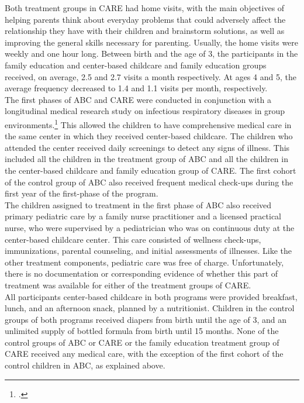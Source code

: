 \noindent Both treatment groups in CARE had home visits, with the main objectives of helping parents think about everyday problems that could adversely affect the relationship they have with their children and brainstorm solutions, as well as improving the general skills necessary for parenting. Usually, the home visits were weekly and one hour long. Between birth and the age of 3, the participants in the family education and center-based childcare and family education groups received, on average, 2.5 and 2.7  visits a month respectively. At ages 4 and 5, the average frequency decreased to 1.4 and 1.1 visits per month, respectively.\\ 

\noindent The first phases of ABC and CARE were conducted in conjunction with a longitudinal medical research study on infectious respiratory diseases in group environments.\footnote{\citet{Henderson-et-al_1982_NEJoM}.} This allowed the children to have comprehensive medical care in the same center in which they received center-based childcare. The children who attended the center received daily screenings to detect any signs of illness. This included all the children in the treatment group of ABC and all the children in the center-based childcare and family education group of CARE. The first cohort of the control group of ABC also received frequent medical check-ups during the first year of the first-phase of the program.\\

\noindent The children assigned to treatment in the first phase of ABC also received primary pediatric care by a family nurse practitioner and a licensed practical nurse, who were supervised by a pediatrician who was on continuous duty at the center-based childcare center. This care consisted of wellness check-ups, immunizations, parental counseling, and initial assessments of illnesses. Like the other treatment components, pediatric care was free of charge. Unfortunately, there is no documentation or corresponding evidence of whether this part of treatment was available for either of the treatment groups of CARE.\\

\noindent All participants center-based childcare in both programs were provided breakfast, lunch, and an afternoon snack, planned by a nutritionist. Children in the control groups of both programs received diapers from birth until the age of 3, and an unlimited supply of bottled formula from birth until 15 months. None of the control groups of  ABC or CARE or the family education treatment group of CARE received any medical care, with the exception of the first cohort of the control children in ABC, as explained above.\\

